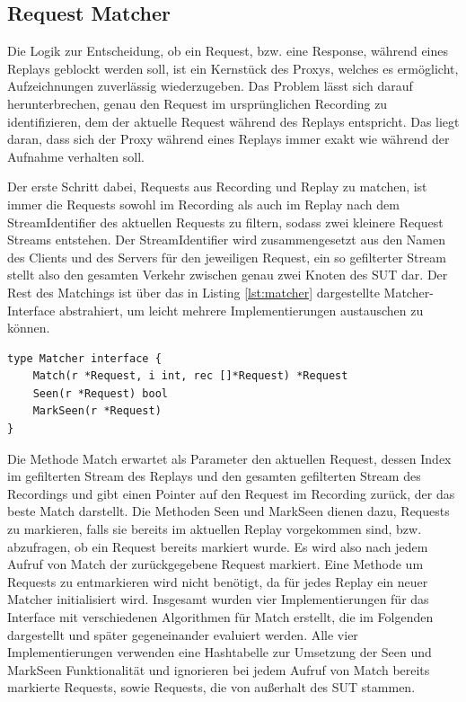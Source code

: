 \documentclass[12pt,a4paper]{report}
\begin{document}
\subsection{Request Matcher}
\label{chap:matcher}
Die Logik zur Entscheidung, ob ein Request, bzw. eine Response, während eines Replays geblockt werden soll,
ist ein Kernstück des Proxys, welches es ermöglicht, Aufzeichnungen zuverlässig wiederzugeben.
Das Problem lässt sich darauf herunterbrechen, genau den Request im ursprünglichen Recording zu identifizieren,
dem der aktuelle Request während des Replays entspricht. Das liegt daran, dass sich der Proxy während eines
Replays immer exakt wie während der Aufnahme verhalten soll.

Der erste Schritt dabei, Requests aus Recording und Replay zu matchen, ist immer die Requests sowohl im Recording als auch im
Replay nach dem StreamIdentifier des aktuellen Requests zu filtern, sodass zwei kleinere Request Streams entstehen. Der
StreamIdentifier wird zusammengesetzt aus den Namen des Clients und des Servers für den jeweiligen Request, ein so gefilterter
Stream stellt also den gesamten Verkehr zwischen genau zwei Knoten des SUT dar. Der Rest des Matchings ist über das in Listing
\ref{lst:matcher} dargestellte Matcher-Interface abstrahiert, um leicht mehrere Implementierungen austauschen zu können.
\begin{lstlisting}[caption={Das Matcher-Interface in ditm}, label={lst:matcher}]
type Matcher interface {
   	Match(r *Request, i int, rec []*Request) *Request
   	Seen(r *Request) bool
    MarkSeen(r *Request)
}
\end{lstlisting}
Die Methode Match erwartet als Parameter den aktuellen Request, dessen Index im gefilterten Stream des Replays
und den gesamten gefilterten Stream des Recordings und gibt einen Pointer auf den Request im Recording zurück,
der das beste Match darstellt. Die Methoden Seen und MarkSeen dienen dazu, Requests zu markieren, falls sie bereits
im aktuellen Replay vorgekommen sind, bzw. abzufragen, ob ein Request bereits markiert wurde. Es wird also nach jedem Aufruf
von Match der zurückgegebene Request markiert. Eine Methode um Requests zu entmarkieren wird nicht benötigt, da für
jedes Replay ein neuer Matcher initialisiert wird. Insgesamt wurden vier Implementierungen für das Interface mit
verschiedenen Algorithmen für Match erstellt, die im Folgenden dargestellt und später gegeneinander evaluiert werden.
Alle vier Implementierungen verwenden eine Hashtabelle zur Umsetzung der Seen und MarkSeen Funktionalität und ignorieren
bei jedem Aufruf von Match bereits markierte Requests, sowie Requests, die von außerhalt des SUT stammen.
\end{document}
